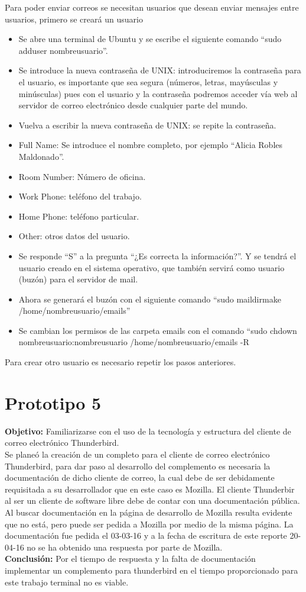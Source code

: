Para poder enviar correos se necesitan usuarios que desean enviar mensajes entre usuarios, primero se creará un usuario
\begin{itemize}
 \item Se abre una terminal de Ubuntu y se escribe el siguiente comando “sudo adduser nombreusuario”.
 \item Se introduce la nueva contraseña de UNIX: introduciremos la contraseña para el usuario, es importante que sea segura (números, letras, mayúsculas y minúsculas) pues con el usuario y la contraseña podremos acceder vía web al servidor de correo electrónico desde cualquier parte del mundo.
 \item Vuelva a escribir la nueva contraseña de UNIX: se repite la contraseña.
 \item Full Name: Se introduce el nombre completo, por ejemplo ``Alicia Robles Maldonado''.
 \item Room Number: Número de oficina.
 \item Work Phone: teléfono del trabajo.
 \item Home Phone: teléfono particular.
 \item Other: otros datos del usuario.
 \item Se responde ``S'' a la pregunta ``¿Es correcta la información?''. Y se tendrá el usuario creado en el sistema operativo, que también servirá como usuario (buzón) para el servidor de mail.
 \item Ahora se generará el buzón con el siguiente comando “sudo maildirmake /home/nombreusuario/emails”
 \item Se cambian los permisos de las carpeta emails con el comando “sudo chdown nombreusuario:nombreusuario /home/nombreusuario/emails -R
\end{itemize}
Para crear otro usuario es necesario repetir los pasos anteriores.
\section{Prototipo 5}
\textbf{Objetivo:} Familiarizarse con el uso de la tecnología y estructura del cliente de correo electrónico Thunderbird.\\
Se planeó la creación de un completo para el cliente de correo electrónico Thunderbird, para dar paso al desarrollo del complemento es necesaria la documentación de dicho cliente de correo, la cual debe de ser debidamente requisitada a su desarrollador que en este caso es Mozilla. 
El cliente Thunderbir al ser un cliente de software libre debe de contar con una documentación pública. Al buscar documentación en la página de desarrollo de Mozilla resulta evidente que no está, pero puede ser pedida a Mozilla por medio de la misma página. La documentación fue pedida el 03-03-16 y a la fecha de escritura de este reporte 20-04-16 no se ha obtenido una respuesta por parte de Mozilla.\\
\textbf{Conclusión:} Por el tiempo de respuesta y la falta de documentación implementar un complemento para thunderbird en el tiempo proporcionado para este trabajo terminal no es viable.
